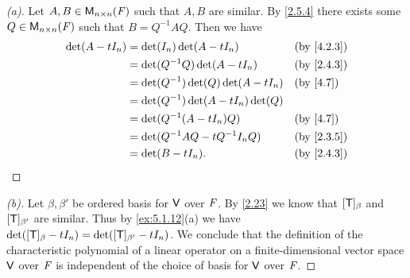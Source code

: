 \begin{proof}[(a)]
  Let \(A, B \in \mathsf{M}_{{n} \times n}({\mathit{F}})\) such that \(A, B\) are similar.
  By \cref{2.5.4} there exists some \(Q \in \mathsf{M}_{{n} \times n}({\mathit{F}})\) such that \(B = Q^{-1} A Q\).
  Then we have
  \begin{align*}
    \det(A - t I_n) & = \det(I_n) \det(A - t I_n)            &  & \text{(by \cref{4.2.3})} \\
                    & = \det(Q^{-1} Q) \det(A - t I_n)       &  & \text{(by \cref{2.4.3})} \\
                    & = \det(Q^{-1}) \det(Q) \det(A - t I_n) &  & \text{(by \cref{4.7})}   \\
                    & = \det(Q^{-1}) \det(A - t I_n) \det(Q)                               \\
                    & = \det(Q^{-1} (A - t I_n) Q)           &  & \text{(by \cref{4.7})}   \\
                    & = \det(Q^{-1} A Q - t Q^{-1} I_n Q)    &  & \text{(by \cref{2.3.5})} \\
                    & = \det(B - t I_n).                     &  & \text{(by \cref{2.4.3})}
  \end{align*}
\end{proof}

\begin{proof}[(b)]
  Let \(\beta, \beta'\) be ordered basis for \(\mathsf{V}\) over \(\mathit{F}\).
  By \cref{2.23} we know that \([\mathsf{T}]_{\beta}\) and \([\mathsf{T}]_{\beta'}\) are similar.
  Thus by \cref{ex:5.1.12}(a) we have \(\det([\mathsf{T}]_{\beta} - t I_n) = \det([\mathsf{T}]_{\beta'} - t I_n)\).
  We conclude that the definition of the characteristic polynomial of a linear operator on a finite-dimensional vector space \(\mathsf{V}\) over \(\mathit{F}\) is independent of the choice of basis for \(\mathsf{V}\) over \(\mathit{F}\).
\end{proof}
